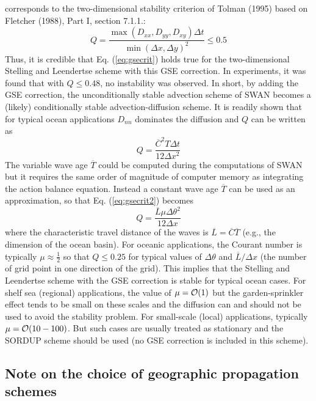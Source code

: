 \documentclass[12pt]{book}
\begin{document}
corresponds to the two-dimensional stability criterion of Tolman (1995) based on Fletcher (1988), Part I, section 7.1.1.:
\begin{equation}
  Q = \frac{\max(D_{xx},D_{yy},D_{xy})\Delta t}{\min(\Delta x,\Delta y)^2} \leq 0.5
  \label{eq:gsecrit}
\end{equation}
Thus, it is credible that Eq. (\ref{eq:gsecrit}) holds true for the two-dimensional Stelling and Leendertse scheme with this GSE correction. In experiments,
it was found that with $Q \leq 0.48$, no instability was observed. In short, by adding the GSE correction, the unconditionally stable advection scheme of
SWAN becomes a (likely) conditionally stable advection-diffusion scheme. It is readily shown that for typical ocean applications $D_{nn}$ dominates the
diffusion and $Q$ can be written as
\begin{equation}
  Q = \frac{{{\overline C}}^2 T \Delta t}{12 \Delta x^2}
  \label{eq:gsecrit2}
\end{equation}
The variable wave age $\overline{T}$ could be computed during the computations of SWAN but it requires the same order of magnitude of computer memory as
integrating the action balance equation. Instead a constant wave age $\overline{T}$ can be used as an approximation, so that Eq. (\ref{eq:gsecrit2})
becomes
\begin{equation}
  Q = \frac{{\overline L} \mu \Delta \theta^2}{12 \Delta x}
\end{equation}
where the characteristic travel distance of the waves is ${\overline L} = {\overline C}{\overline T}$ (e.g., the dimension of the ocean basin). For
oceanic applications, the Courant number is typically $\mu \approx \frac{1}{2}$ so that $Q \leq 0.25$ for typical values of $\Delta \theta$ and
${\overline L}/\Delta x$ (the number of grid point in one direction of the grid). This implies that the Stelling and Leendertse scheme with the
GSE correction is stable for typical ocean cases. For shelf sea (regional) applications, the value of $\mu = {\cal O} (1)$ but the garden-sprinkler
effect tends to be small on these scales and the diffusion can and should not be used to avoid the stability problem. For small-scale (local)
applications, typically $\mu = {\cal O} (10-100)$. But such cases are usually treated as stationary and the SORDUP scheme should be used (no GSE
correction is included in this scheme).

\subsection{Note on the choice of geographic propagation schemes}
\end{document}
